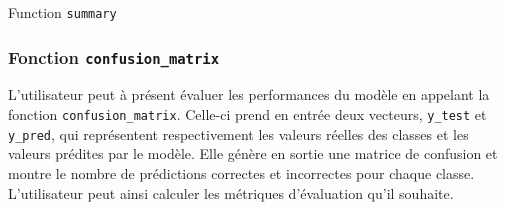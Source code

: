 \documentclass[]{article}
\begin{document}
\newpage

\begin{algorithm}
    \caption{Function \texttt{summary}}
    

\end{algorithm}
\vspace{0.3\baselineskip}
\subsubsection{Fonction \texttt{confusion\_matrix}} 
L'utilisateur peut à présent évaluer les performances du modèle en appelant la fonction \texttt{confusion\_matrix}. Celle-ci prend en entrée deux vecteurs, \texttt{y\_test} et \texttt{y\_pred}, qui représentent respectivement les valeurs réelles des classes et les valeurs prédites par le modèle. Elle génère en sortie une matrice de confusion et montre le nombre de prédictions correctes et incorrectes pour chaque classe. L'utilisateur peut ainsi calculer les métriques d'évaluation qu'il souhaite.
\end{document}
